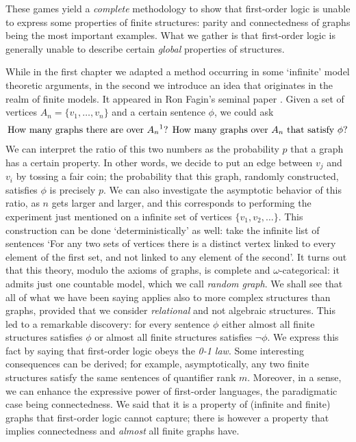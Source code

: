 These games yield a \emph{complete} methodology to show that first-order logic is unable to express some properties of finite structures: parity and connectedness of graphs being the most important examples. 
What we gather is that first-order logic is generally unable to describe certain \emph{global} properties of structures. 
 

While in the first chapter we adapted a method occurring in some `infinite' model theoretic arguments, in the second we introduce an idea that originates in the realm of finite models. 
It appeared in Ron Fagin's seminal paper \cite{fagin_prob}. 
Given a set of vertices $A_n =\{v_1, \ldots, v_n\}$ and a certain sentence $\phi$, we could ask 
\begin{align}
\label{intro_uno}
\text{How many graphs there are over $A_n$\footnotemark?
How many graphs over $A_n$ that satisfy $\phi$?}
\end{align}
We can interpret the ratio of this two numbers as the probability $p$ that a graph has a certain property. 
In other words, we decide to put an edge between $v_j$ and $v_i$ by tossing a fair coin; the probability that this graph, randomly constructed, satisfies $\phi$ is precisely $p$. 
We can also investigate the asymptotic behavior of this ratio, as $n$ gets larger and larger, and this corresponds to performing the experiment just mentioned on a infinite set of vertices $\{v_1, v_2 , \ldots\}$. 
This construction can be done `deterministically' as well: take the infinite list of sentences `For any two sets of vertices there is a distinct vertex linked to every element of the first set, and not linked to any element of the second'. 
It turns out that this theory, modulo the axioms of graphs, is complete and $\omega$-categorical: it admits just one countable model, which we call \emph{random graph}. 
We shall see that all of what we have been saying applies also to more complex structures than graphs, provided that we consider \emph{relational} and not algebraic structures. %
This led to a remarkable discovery: for every sentence $\phi$ either almost all finite structures satisfies $\phi$ or almost all finite structures satisfies $\lnot \phi$. 
We express this fact by saying that first-order logic obeys the \emph{0-1 law}. Some interesting consequences can be derived; for example, asymptotically, any two finite structures satisfy the same sentences of quantifier rank $m$. 
Moreover, in a sense, we can enhance the expressive power of first-order languages, the paradigmatic case being connectedness. 
We said that it is a property of (infinite and finite) graphs that first-order logic cannot capture; there is however a property that implies connectedness and \emph{almost} all finite graphs have.



